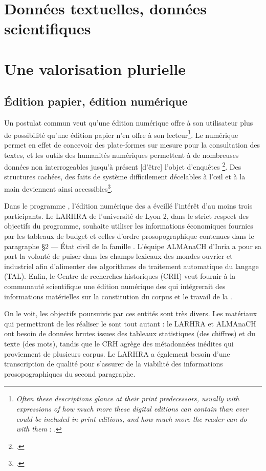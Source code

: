 \chapter{Données textuelles, données scientifiques}

\chapter{Une valorisation plurielle}

\section{Édition papier, édition numérique}

Un postulat commun veut qu'une édition numérique offre à son utilisateur plus de possibilité qu'une édition papier n'en offre à son lecteur\footnote{\og \textit{Often these descriptions glance at their print predecessors, usually with expressions of how much more these digital editions can contain than ever could be included in print editions, and how much more the reader can do with them} \fg{} : \cite[p. 105-106]{robinson}.}. Le numérique permet en effet de concevoir des plate-formes sur mesure pour la consultation des textes, et les outils des humanités numériques permettent à \og de nombreuses données non interrogeables jusqu’à présent [d'être] l’objet d’enquêtes \fg\footcite[p. 20]{duval}. \og Des structures cachées, des faits de système difficilement décelables à l’œil et à la main \fg{} deviennent ainsi accessibles\footcite{duval}.

Dans le programme \timeus{}, l'édition numérique des \odm{} a éveillé l'intérêt d'au moins trois participants. Le LARHRA de l'université de Lyon 2, dans le strict respect des objectifs du programme, souhaite utiliser les informations économiques fournies par les tableaux de budget et celles d'ordre prosopographique contenues dans le paragraphe \og §2 --- État civil de la famille \fg. L'équipe ALMAnaCH d'Inria a pour sa part la volonté de puiser dans les champs lexicaux des mondes ouvrier et industriel afin d'alimenter des algorithmes de traitement automatique du langage (TAL). Enfin, le Centre de recherches historiques (CRH) veut fournir à la communauté scientifique une édition numérique des \odm{} qui intégrerait des informations matérielles sur la constitution du corpus et le travail de la \sess.

On le voit, les objectifs poursuivis par ces entités sont très divers. Les matériaux qui permettront de les réaliser le sont tout autant : le LARHRA et ALMAnaCH ont besoin de données brutes issues des tableaux statistiques (des chiffres) et du texte (des mots), tandis que le CRH agrège des métadonnées inédites qui proviennent de plusieurs corpus. Le LARHRA a également besoin d'une transcription de qualité pour s'assurer de la viabilité des informations prosopographiques du second paragraphe.

